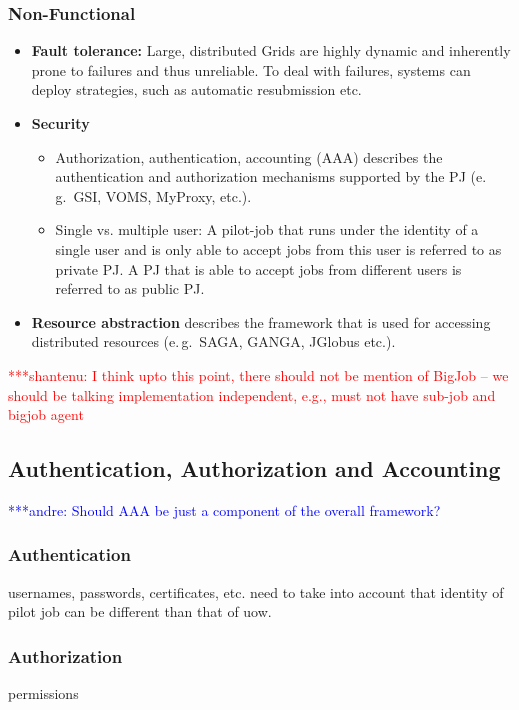 \documentclass[conference,final]{IEEEtran}
\newcommand{\jhanote}[1]{ {\textcolor{red} { ***shantenu: #1 }}}
\newcommand{\alnote}[1]{ {\textcolor{blue} { ***andre: #1 }}}
\newcommand{\alnote}[1]{}
\newcommand{\jhanote}[1]{}
\begin{document}
\subsubsection{Non-Functional}

\begin{itemize}
	\item \textbf{Fault tolerance:} Large, distributed Grids are highly dynamic 
	and inherently prone to failures and thus unreliable. To deal with failures, 
	systems can deploy strategies, such as automatic resubmission etc.
	\item \textbf{Security}
	\begin{itemize}
       \item Authorization, authentication, accounting (AAA) describes the 
       authentication and authorization mechanisms supported by the PJ (e.\,g.\  
       GSI, VOMS, MyProxy, etc.). 
	   \item Single vs. multiple user: A pilot-job that runs under the identity 
	   of a single user and is only able to accept jobs from this user is 
	   referred to as private PJ. A PJ that is able to accept jobs from 
	   different users is referred to as public PJ.
	\end{itemize}
	\item \textbf{Resource abstraction} describes the framework that is used for accessing distributed resources (e.\,g.\ SAGA, GANGA, JGlobus etc.).
\end{itemize}

\jhanote{I think upto this point, there should not be mention of
  BigJob -- we should be talking implementation independent, e.g., must
  not have sub-job and bigjob agent}


\subsection{Authentication, Authorization and Accounting}
\alnote{Should AAA be just a component of the overall framework?}

\subsubsection{Authentication}
usernames, passwords, certificates, etc.
need to take into account that identity of pilot job can be different than that of uow.

\subsubsection{Authorization}
permissions
\end{document}
